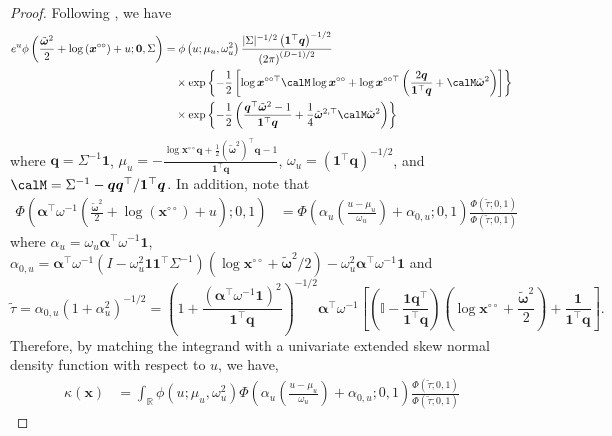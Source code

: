 \documentclass[12pt]{article}
\begin{document}
\begin{proof}
Following \citet{Wadsworth.Tawn:2014}, we have
%
\begin{align*}
e^{u} \phi\left( \frac{\tilde{\bm \omega}^2}{2} + \log\left(\bm x^{\circ\circ}\right) + u; \bm 0, \Sigma\right) &=
\phi \left( u; \mu_u, \omega_u^2 \right) 
\frac{| \Sigma |^{-1/2} \left( \bm 1^\top \bm q\right)^{-1/2}}{\left( 2\pi \right)^{(D-1)/2}} \\
&\quad \times \exp \left\{ -\frac{1}{2} \left[ \log \bm x^{\circ\circ\top} \calM \log \bm x^{\circ\circ} + \log \bm x^{\circ\circ\top} \left( \frac{2 \bm q}{\bm 1^\top \bm q} + \calM\tilde{\bm\omega}^2\right) \right]\right\} \\
& \quad \times \exp \left\{- \frac{1}{2} \left( \frac{\bm q^\top\tilde{\bm \omega}^2 - 1}{\bm 1 ^\top \bm q} + \frac{1}{4}\tilde{\bm\omega}^{2,\top}\calM\tilde{\bm\omega}^2\right) \right\}
\end{align*}
%
where $\bm q = \Sigma^{-1} \bm 1$, $\mu_u=-\frac{\log \bm x^{\circ\circ}\bm q + \frac{1}{2} \left(\tilde{\bm \omega}^2\right)^\top \bm q - 1}{\bm 1^\top \bm q}$, $\omega_u=\left( \bm 1^\top \bm q \right)^{-1/2}$, and $\calM = \Sigma^{-1} - \bm q \bm q^\top / \bm 1^\top \bm q$. In addition, note that
%
\begin{align*}
\Phi\left( \bm \alpha^\top \omega^{-1} \left( \frac{\tilde{\bm \omega}^2}{2} + \log\left(\bm x^{\circ\circ}\right) + u \right); 0, 1\right) 
&= \Phi\left( \alpha_u\left(\frac{u-\mu_u}{\omega_u}\right) + \alpha_{0,u};0,1\right)\frac{\Phi(\tilde{\tau};0,1)}{\Phi(\tilde{\tau};0,1)}
\end{align*}
where $\alpha_u = \omega_u\bm\alpha^\top\omega^{-1}\bm 1$, $\alpha_{0,u} = \bm\alpha^\top\omega^{-1}\left(I - \omega_u^2\bm 1\bm 1^\top \Sigma^{-1}\right)\left(\log \bm x^{\circ\circ}+\tilde{\bm\omega}^2/2\right) - \omega_u^2\bm\alpha^\top\omega^{-1}\bm 1$ and 
%
\begin{equation}
\label{eq:tilde_tau}
\tilde{\tau} = \alpha_{0,u}(1+\alpha_u^2)^{-1/2}= \left(1 + \frac{(\bm\alpha^\top\omega^{-1}\bm 1)^2}{\bm 1^\top \bm q}\right)^{-1/2}\bm\alpha^\top\omega^{-1}\left[\left(\mathbb{I} - \frac{\bm 1\bm q^\top}{\bm 1^\top\bm q}\right)\left(\log \bm x^{\circ\circ} + \frac{\tilde{\bm\omega}^2}{2}\right) +  \frac{\bm 1}{\bm 1^\top \bm q} \right].
\end{equation}
%
Therefore, by matching the integrand with a univariate extended skew normal density function with respect to $u$,  we have,
\begin{align*}
\kappa(\bm x) &=  \int_{\mathbb R} \phi \left( u; \mu_u, \omega_u^2 \right) \Phi\left( \alpha_u\left(\frac{u-\mu_u}{\omega_u}\right) + \alpha_{0,u};0,1\right)\frac{\Phi(\tilde{\tau};0,1)}{\Phi(\tilde{\tau};0,1)}

\end{align*}
\end{proof}
\end{document}
